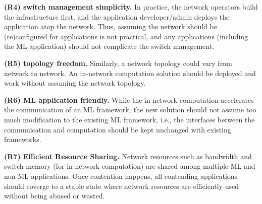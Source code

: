 \textbf{(R4) switch management simplicity.} In practice, the network operators build the infrastructure first, and the application developer/admin deploys the application atop the network. Thus, assuming the network should be (re)configured for applications is not practical, and any applications (including the ML application) should not complicate the switch management.

\textbf{(R5) topology freedom.} Similarly, a network topology could vary from network to network. An in-network computation solution should be deployed and work without assuming the network topology.

\textbf{(R6) ML application friendly.} While the in-network computation accelerates the communication of an ML framework, the new solution should not assume too much modification to the existing ML framework, i.e., the interfaces between the communication and computation should be kept unchanged with existing frameworks.

\textbf{(R7) Efficient Resource Sharing.} Network resources such as bandwidth and switch memory (for in-network computation) are shared among multiple ML and non-ML applications. Once contention happens, all contending applications should coverge to a stable state where network resources are efficiently used without being abused or wasted.















